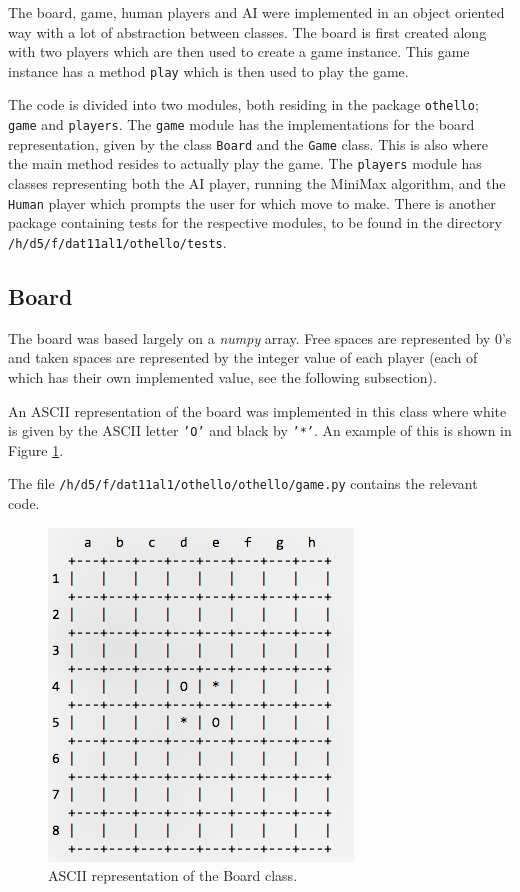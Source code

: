 \documentclass{article}
\begin{document}
The board, game, human players and AI were implemented in an object oriented way with a lot of abstraction between classes. The board is first created along with two players which are then used to create a game instance. This game instance has a method \texttt{play} which is then used to play the game. 

The code is divided into two modules, both residing in the package \texttt{othello}; \texttt{game} and \texttt{players}. The \texttt{game} module has the implementations for the board representation, given by the class \texttt{Board} and the \texttt{Game} class. This is also where the main method resides to actually play the game. The \texttt{players} module has classes representing both the AI player, running the MiniMax algorithm, and the \texttt{Human} player which prompts the user for which move to make. There is another package containing tests for the respective modules, to be found in the directory \texttt{/h/d5/f/dat11al1/othello/tests}.

\subsection{Board}

The board was based largely on a \emph{numpy} array. Free spaces are represented by 0's and taken spaces are represented by the integer value of each player (each of which has their own implemented value, see the following subsection).

An ASCII representation of the board was implemented in this class where white is given by the ASCII letter \texttt{'O'} and black by \texttt{'*'}. An example of this is shown in Figure \ref{fig:ascii-board}. 

The file \texttt{/h/d5/f/dat11al1/othello/othello/game.py} contains the relevant code.

\begin{figure}[h!]
\centering
\includegraphics[scale=0.6]{ascii-board.png}
\caption{ASCII representation of the Board class.}
\label{fig:ascii-board}
\end{figure}
\end{document}
